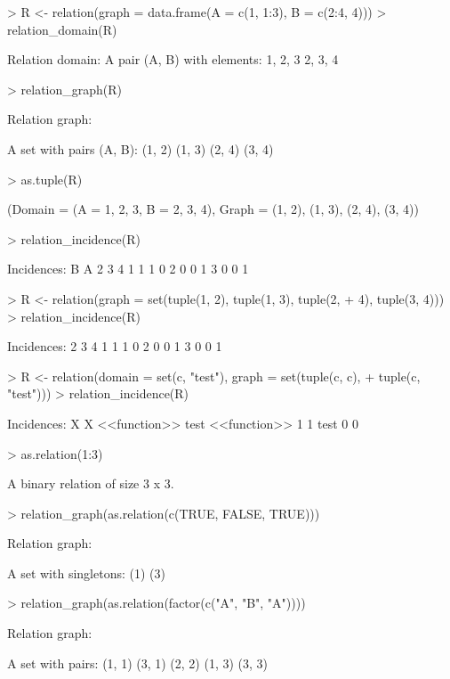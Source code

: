 \documentclass[fleqn]{article}
\begin{document}
\begin{Schunk}
\begin{Sinput}
> R <- relation(graph = data.frame(A = c(1, 1:3), B = c(2:4, 4)))
> relation_domain(R)
\end{Sinput}
\begin{Soutput}
Relation domain:
A pair (A, B) with elements:
{1, 2, 3}
{2, 3, 4}
\end{Soutput}
\begin{Sinput}
> relation_graph(R)
\end{Sinput}
\begin{Soutput}
Relation graph:

A set with pairs (A, B):
(1, 2)
(1, 3)
(2, 4)
(3, 4)
\end{Soutput}
\begin{Sinput}
> as.tuple(R)
\end{Sinput}
\begin{Soutput}
(Domain = (A = {1, 2, 3}, B = {2, 3, 4}), Graph = {(1, 2), (1, 3), (2,
 4), (3, 4)})
\end{Soutput}
\begin{Sinput}
> relation_incidence(R)
\end{Sinput}
\begin{Soutput}
Incidences:
   B
A   2 3 4
  1 1 1 0
  2 0 0 1
  3 0 0 1
\end{Soutput}
\begin{Sinput}
> R <- relation(graph = set(tuple(1, 2), tuple(1, 3), tuple(2, 
+     4), tuple(3, 4)))
> relation_incidence(R)
\end{Sinput}
\begin{Soutput}
Incidences:
  2 3 4
1 1 1 0
2 0 0 1
3 0 0 1
\end{Soutput}
\begin{Sinput}
> R <- relation(domain = set(c, "test"), graph = set(tuple(c, c), 
+     tuple(c, "test")))
> relation_incidence(R)
\end{Sinput}
\begin{Soutput}
Incidences:
              X
X              <<function>> test
  <<function>>            1    1
  test                    0    0
\end{Soutput}
\begin{Sinput}
> as.relation(1:3)
\end{Sinput}
\begin{Soutput}
A binary relation of size 3 x 3.
\end{Soutput}
\begin{Sinput}
> relation_graph(as.relation(c(TRUE, FALSE, TRUE)))
\end{Sinput}
\begin{Soutput}
Relation graph:

A set with singletons:
(1)
(3)
\end{Soutput}
\begin{Sinput}
> relation_graph(as.relation(factor(c("A", "B", "A"))))
\end{Sinput}
\begin{Soutput}
Relation graph:

A set with pairs:
(1, 1)
(3, 1)
(2, 2)
(1, 3)
(3, 3)
\end{Soutput}
\end{Schunk}
\end{document}
